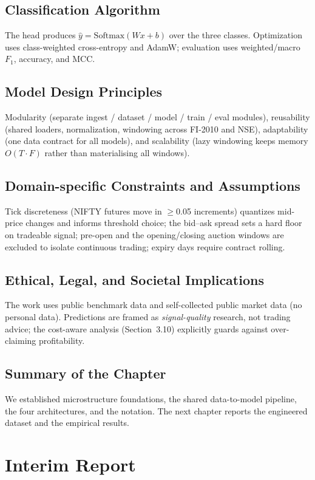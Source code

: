 \documentclass[11pt]{article}
\begin{document}
\subsection{Classification Algorithm}
The head produces $\hat{y} = \mathrm{Softmax}(Wx+b)$ over the three classes. Optimization uses
class-weighted cross-entropy and AdamW; evaluation uses weighted/macro $F_1$, accuracy, and MCC.

\subsection{Model Design Principles}
Modularity (separate ingest / dataset / model / train / eval modules), reusability (shared loaders,
normalization, windowing across FI-2010 and NSE), adaptability (one data contract for all models), and
scalability (lazy windowing keeps memory $O(T\cdot F)$ rather than materialising all windows).

\subsection{Domain-specific Constraints and Assumptions}
Tick discreteness (NIFTY futures move in $\geq$0.05 increments) quantizes mid-price changes and informs
threshold choice; the bid--ask spread sets a hard floor on tradeable signal; pre-open and the
opening/closing auction windows are excluded to isolate continuous trading; expiry days require contract
rolling.

\subsection{Ethical, Legal, and Societal Implications}
The work uses public benchmark data and self-collected public market data (no personal data). Predictions
are framed as \emph{signal-quality} research, not trading advice; the cost-aware analysis (Section~3.10)
explicitly guards against over-claiming profitability.

\subsection{Summary of the Chapter}
We established microstructure foundations, the shared data-to-model pipeline, the four architectures, and
the notation. The next chapter reports the engineered dataset and the empirical results.

\section{Interim Report}
\end{document}
